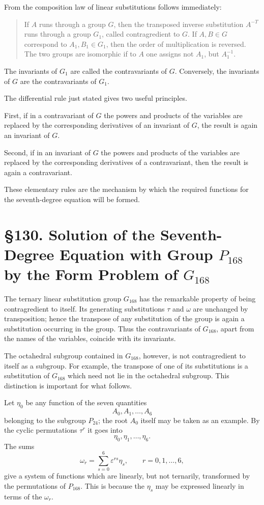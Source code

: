 \documentclass[11pt,a4paper]{book}
\newcommand{\webersection}[2]{\clearpage\section*{\S #1. #2}}
\newcommand{\eps}{\varepsilon}
\begin{document}
From the composition law of linear substitutions follows immediately:
\begin{quote}
If \(A\) runs through a group \(G\), then the transposed inverse substitution \(A^{-T}\) runs through a group \(G_1\), called contragredient to \(G\).  If \(A,B\in G\) correspond to \(A_1,B_1\in G_1\), then the order of multiplication is reversed.  The two groups are isomorphic if to \(A\) one assigns not \(A_1\), but \(A_1^{-1}\).
\end{quote}
The invariants of \(G_1\) are called the contravariants of \(G\).  Conversely, the invariants of \(G\) are the contravariants of \(G_1\).

The differential rule just stated gives two useful principles.

First, if in a contravariant of \(G\) the powers and products of the variables are replaced by the corresponding derivatives of an invariant of \(G\), the result is again an invariant of \(G\).

Second, if in an invariant of \(G\) the powers and products of the variables are replaced by the corresponding derivatives of a contravariant, then the result is again a contravariant.

These elementary rules are the mechanism by which the required functions for the seventh-degree equation will be formed.

\webersection{130}{Solution of the Seventh-Degree Equation with Group \(P_{168}\) by the Form Problem of \(G_{168}\)}

The ternary linear substitution group \(G_{168}\) has the remarkable property of being contragredient to itself.  Its generating substitutions \(\tau\) and \(\omega\) are unchanged by transposition; hence the transpose of any substitution of the group is again a substitution occurring in the group.  Thus the contravariants of \(G_{168}\), apart from the names of the variables, coincide with its invariants.

The octahedral subgroup contained in \(G_{168}\), however, is not contragredient to itself as a subgroup.  For example, the transpose of one of its substitutions is a substitution of \(G_{168}\) which need not lie in the octahedral subgroup.  This distinction is important for what follows.

Let \(\eta_0\) be any function of the seven quantities
\[
 A_0,A_1,\ldots,A_6
\]
belonging to the subgroup \(P_{24}\); the root \(A_0\) itself may be taken as an example.  By the cyclic permutations \(\tau^r\) it goes into
\[
 \eta_0,\eta_1,\ldots,\eta_6.
\]
The sums
\begin{equation}
 \omega_r=\sum_{s=0}^{6}\eps^{rs}\eta_s,
 \qquad r=0,1,\ldots,6, \tag{1}
\end{equation}
give a system of functions which are linearly, but not ternarily, transformed by the permutations of \(P_{168}\).  This is because the \(\eta_s\) may be expressed linearly in terms of the \(\omega_r\).
\end{document}
